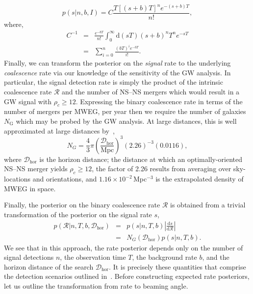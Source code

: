 \documentclass[twocolumn,nofootinbib]{revtex4-1}
\newcommand{\cbcrate}{{{\mathcal R}}}
\newcommand{\diff}{{\mathrm d}}
\newcommand{\dhor}{{\mathcal D}_{\mathrm{hor}}}
\newcommand{\BNS}{\ac{NS}--\ac{NS}\xspace}
\begin{document}
%
\begin{equation}
p(s|n,b,I) = C \frac{ T\left[(s+b)T\right]^n e^{-(s+b)T}}{n!},
\end{equation}
%
where,
\begin{eqnarray}
C^{-1} & = &\frac{e^{-bT}}{n!} \int_0^{\infty}\diff(sT)(s+b)^n T^n e^{-sT}\\
& = & \sum_{i=0}^n \frac{ (bT)^i e^{-bT}}{i!}.
\end{eqnarray}
%
Finally, we can transform the posterior on the \emph{signal} rate to the underlying \emph{coalescence} rate via our knowledge of the sensitivity of the \ac{GW} analysis.
In particular, the signal detection rate is simply the product of the intrinsic coalescence rate $\cbcrate$ and the number of \BNS mergers which would result in a \ac{GW} signal with $\rho_c\geq12$.
Expressing the binary coalescence rate in terms of the number of mergers per \ac{MWEG}, per year then we require the number of galaxies $N_{\mathrm{G}}$ which may be probed by the \ac{GW} analysis.
At large distances, this is well approximated at large distances by~\cite{rates_paper},
%
\begin{equation}
    N_G = \frac{4}{3} \pi \left( \frac{\dhor}{\textrm{Mpc}}
\right)^3 (2.26)^{-3} (0.0116),
\end{equation}
%
where $\dhor$ is the horizon distance; the distance at which an optimally-oriented \BNS merger yields $\rho_c\geq12$, the factor of 2.26 results from averaging over sky-locations and orientations, and $1.16\times 10^{-2}$\,Mpc$^{-3}$ is the extrapolated density of \ac{MWEG} in space.

Finally, the posterior on the binary coalescence rate $\cbcrate$ is obtained from a trivial transformation of the posterior on the signal rate $s$,
%
\begin{eqnarray}
    p(\cbcrate|n,T,b,\dhor) & = & p(s|n,T,b) \left|\frac{\diff s}{\diff \cbcrate}\right| \\
                                   & = & N_G(\dhor)p(s|n,T,b).
\end{eqnarray}
%
We see that in this approach, the rate posterior depends only on the number of signal detections $n$, the observation time $T$, the background rate $b$, and the horizon distance of the search $\dhor$.
It is precisely these quantities that comprise the detection scenarios outlined in~\cite{Aasi:2013wya}.
Before constructing expected rate posteriors, let us outline the transformation from rate to beaming angle.
\end{document}
